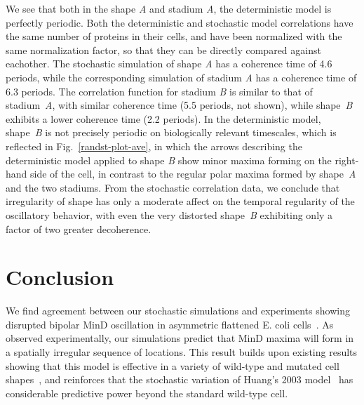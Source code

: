 \documentclass[letterpaper,twocolumn,amsmath,amssymb,pre]{revtex4-1}
\begin{document}

We see that both in the shape \emph{A} and stadium \emph{A}, the
deterministic model is perfectly periodic.  Both the deterministic and
stochastic model correlations have the same number of proteins in
their cells, and have been normalized with the same normalization
factor, so that they can be directly compared against eachother.  The
stochastic simulation of shape \emph{A} has a coherence time of 4.6
periods, while the corresponding simulation of stadium \emph{A} has a
coherence time of 6.3 periods.
%
The correlation function for stadium \emph{B} is similar to that of
stadium~\emph{A}, with similar coherence time (5.5 periods, not
shown), while shape~\emph{B} exhibits a lower coherence time (2.2
periods).  In the deterministic model, shape~\emph{B} is not precisely
periodic on biologically relevant timescales, which is reflected in
Fig.~\ref{randst-plot-ave}, in which the arrows describing the
deterministic model applied to shape \emph{B} show minor maxima
forming on the right-hand side of the cell, in contrast to the regular
polar maxima formed by shape~\emph{A} and the two stadiums.
%
From the stochastic correlation data, we conclude that irregularity of
shape has only a moderate affect on the temporal regularity of the
oscillatory behavior, with even the very distorted shape~\emph{B}
exhibiting only a factor of two greater decoherence.

\section{Conclusion}

We find agreement between our stochastic simulations and experiments
showing disrupted bipolar MinD oscillation in asymmetric flattened
E. coli cells~\cite{mannik2012robustness}.  As observed
experimentally, our simulations predict that MinD maxima will form in
a spatially irregular sequence of locations.  This result builds upon
existing results showing that this model is effective in a variety of
wild-type and mutated cell shapes~\cite{fange2006noise, varma2008min,
  kruse2007experimentalist}, and reinforces that the stochastic
variation of Huang's 2003 model~\cite{fange2006noise,
  kerr2006division} has considerable predictive power beyond the
standard wild-type cell.
\end{document}
